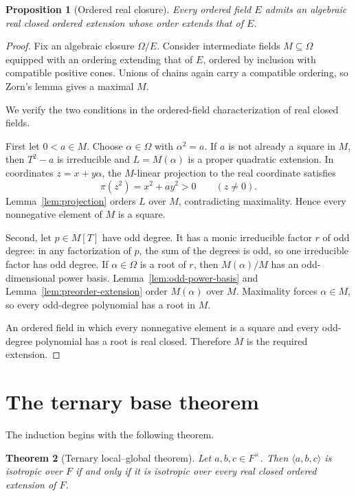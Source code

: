 \documentclass[uplatex,dvipdfmx]{jsarticle}
\newtheorem{theorem}{Theorem}
\newtheorem{proposition}[theorem]{Proposition}
\theoremstyle{definition}
\theoremstyle{remark}
\begin{document}
\begin{proposition}[Ordered real closure]\label{prop:orc}
Every ordered field $E$ admits an algebraic real closed ordered extension
whose order extends that of $E$.
\end{proposition}
\begin{proof}
Fix an algebraic closure $\Omega/E$.  Consider intermediate fields
$M\subseteq\Omega$ equipped with an ordering extending that of $E$, ordered
by inclusion with compatible positive cones.  Unions of chains again carry a
compatible ordering, so Zorn's lemma gives a maximal $M$.

We verify the two conditions in the ordered-field characterization of real
closed fields.

First let $0<a\in M$.  Choose $\alpha\in\Omega$ with $\alpha^2=a$.  If
$a$ is not already a square in $M$, then $T^2-a$ is irreducible and
$L=M(\alpha)$ is a proper quadratic extension.  In coordinates
$z=x+y\alpha$, the $M$-linear projection to the real coordinate satisfies
\[
  \pi(z^2)=x^2+a y^2>0\qquad(z\ne0).
\]
Lemma~\ref{lem:projection} orders $L$ over $M$, contradicting maximality.
Hence every nonnegative element of $M$ is a square.

Second, let $p\in M[T]$ have odd degree.  It has a monic irreducible factor
$r$ of odd degree: in any factorization of $p$, the sum of the degrees is
odd, so one irreducible factor has odd degree.  If $\alpha\in\Omega$ is a
root of $r$, then $M(\alpha)/M$ has an odd-dimensional power basis.
Lemma~\ref{lem:odd-power-basis} and
Lemma~\ref{lem:preorder-extension} order $M(\alpha)$ over $M$.
Maximality forces $\alpha\in M$, so every odd-degree polynomial has a root
in $M$.

An ordered field in which every nonnegative element is a square and every
odd-degree polynomial has a root is real closed.  Therefore $M$ is the
required extension.
\end{proof}

\section{The ternary base theorem}

The induction begins with the following theorem.

\begin{theorem}[Ternary local--global theorem]\label{thm:ternary}
Let $a,b,c\in F^\times$.  Then
$\langle a,b,c\rangle$ is isotropic over $F$ if and only if it is
isotropic over every real closed ordered extension of $F$.
\end{theorem}
\end{document}
